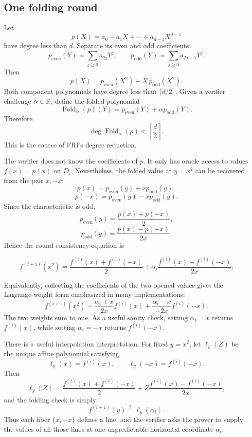 \subsection{One folding round}

Let
\[
    p(X)=a_0+a_1X+\cdots+a_{d-1}X^{d-1}
\]
have degree less than $d$. Separate its even and odd coefficients:
\[
    p_{\mathrm{even}}(Y)=\sum_{j\ge 0}a_{2j}Y^j,
    \qquad
    p_{\mathrm{odd}}(Y)=\sum_{j\ge 0}a_{2j+1}Y^j.
\]
Then
\[
\boxed{
    p(X)=p_{\mathrm{even}}(X^2)+X\,p_{\mathrm{odd}}(X^2).
}
\]
Both component polynomials have degree less than $\lceil d/2\rceil$. Given a verifier
challenge $\alpha\in\mathbb{F}$, define the folded polynomial
\[
    \operatorname{Fold}_{\alpha}(p)(Y)
    =p_{\mathrm{even}}(Y)+\alpha p_{\mathrm{odd}}(Y).
\]
Therefore
\[
    \deg \operatorname{Fold}_{\alpha}(p)<\left\lceil\frac d2\right\rceil.
\]
This is the source of FRI's degree reduction.

The verifier does not know the coefficients of $p$. It only has oracle access to values
$f(x)=p(x)$ on $D_i$. Nevertheless, the folded value at $y=x^2$ can be recovered from the
pair $x,-x$:
\[
    p(x)=p_{\mathrm{even}}(y)+x p_{\mathrm{odd}}(y),
\]
\[
    p(-x)=p_{\mathrm{even}}(y)-x p_{\mathrm{odd}}(y).
\]
Since the characteristic is odd,
\[
    p_{\mathrm{even}}(y)=\frac{p(x)+p(-x)}{2},
\]
\[
    p_{\mathrm{odd}}(y)=\frac{p(x)-p(-x)}{2x}.
\]
Hence the round-consistency equation is
\begin{tcolorbox}
\[
\boxed{
f^{(i+1)}(x^2)
=
\frac{f^{(i)}(x)+f^{(i)}(-x)}{2}
+\alpha_i\frac{f^{(i)}(x)-f^{(i)}(-x)}{2x}.
}
\tag{FRI-fold}
\]
\end{tcolorbox}

Equivalently, collecting the coefficients of the two opened values gives the Lagrange-weight
form emphasized in many implementations:
\[
\boxed{
f^{(i+1)}(x^2)
=
\frac{\alpha_i+x}{2x}f^{(i)}(x)
+\frac{\alpha_i-x}{-2x}f^{(i)}(-x).
}
\]
The two weights sum to one. As a useful sanity check, setting $\alpha_i=x$ returns
$f^{(i)}(x)$, while setting $\alpha_i=-x$ returns $f^{(i)}(-x)$.

There is a useful interpolation interpretation. For fixed $y=x^2$, let $\ell_y(Z)$ be the
unique affine polynomial satisfying
\[
    \ell_y(x)=f^{(i)}(x),
    \qquad
    \ell_y(-x)=f^{(i)}(-x).
\]
Then
\[
    \ell_y(Z)
    =\frac{f^{(i)}(x)+f^{(i)}(-x)}{2}
     +Z\frac{f^{(i)}(x)-f^{(i)}(-x)}{2x},
\]
and the folding check is simply
\[
    f^{(i+1)}(y)\stackrel{?}{=}\ell_y(\alpha_i).
\]
Thus each fiber $\{x,-x\}$ defines a line, and the verifier asks the prover to supply the
values of all those lines at one unpredictable horizontal coordinate $\alpha_i$.

